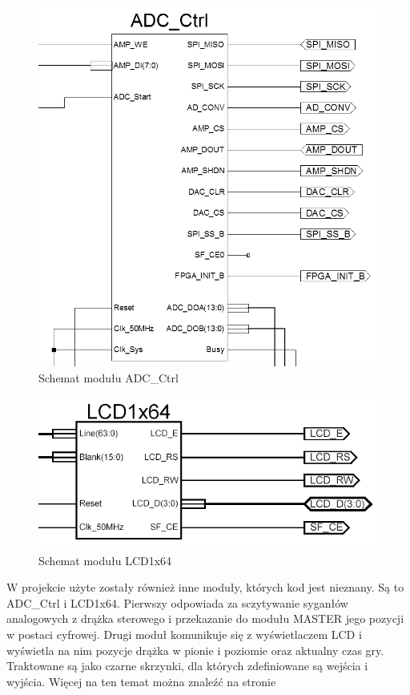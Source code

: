 \documentclass[11pt]{article}
\begin{document}
\begin{figure}[H]
\centering
\includegraphics[scale=.5]{ADC_Ctrl.PNG}
\caption{Schemat modułu ADC\_Ctrl}
\end{figure}

\begin{figure}[H]
\centering
\includegraphics[scale=.5]{LCD1x64.PNG}
\caption{Schemat modułu LCD1x64}
\end{figure}

W projekcie użyte zostały również inne moduły, których kod jest nieznany.
Są to ADC\_Ctrl i LCD1x64.
Pierwszy odpowiada za sczytywanie syganłów analogowych z drążka sterowego i przekazanie do modułu MASTER jego pozycji w postaci cyfrowej.
Drugi moduł komunikuje się z wyświetlaczem LCD i wyświetla na nim pozycje drążka w pionie i poziomie oraz aktualny czas gry.
Traktowane są jako czarne skrzynki, dla których zdefiniowane są wejścia i wyjścia.
Więcej na ten temat można znaleźć na stronie 
\end{document}
